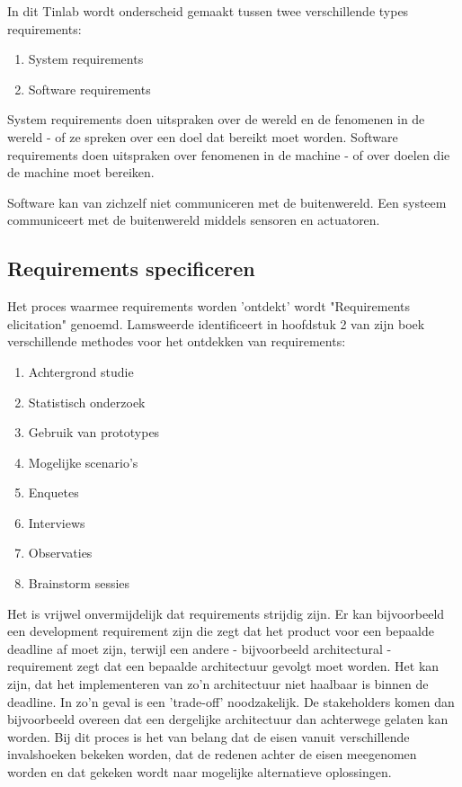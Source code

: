 \documentclass{article}
\begin{document}
	In dit Tinlab wordt onderscheid gemaakt tussen twee verschillende types requirements:

	\begin{enumerate}
		\item System requirements
		\item Software requirements
	\end{enumerate}

	System requirements doen uitspraken over de wereld en de fenomenen in de wereld - of ze spreken over een doel dat bereikt moet worden. Software requirements doen uitspraken over fenomenen in de machine - of over doelen die de machine moet bereiken. \par

	Software kan van zichzelf niet communiceren met de buitenwereld. Een systeem communiceert met de buitenwereld middels sensoren en actuatoren. \par
		
		\subsection{Requirements specificeren}
		
		Het proces waarmee requirements worden 'ontdekt' wordt "Requirements elicitation" genoemd. Lamsweerde identificeert in hoofdstuk 2 van zijn boek verschillende methodes voor het ontdekken van requirements:

		\begin{enumerate}
			\item Achtergrond studie
			\item Statistisch onderzoek
			\item Gebruik van prototypes
			\item Mogelijke scenario's 
			\item Enquetes
			\item Interviews
			\item Observaties
			\item Brainstorm sessies
		\end{enumerate}

		Het is vrijwel onvermijdelijk dat requirements strijdig zijn. Er kan bijvoorbeeld een development requirement zijn die zegt dat het product voor een bepaalde deadline af moet zijn, terwijl een andere - bijvoorbeeld architectural - requirement zegt dat een bepaalde architectuur gevolgt moet worden. Het kan zijn, dat het implementeren van zo'n architectuur niet haalbaar is binnen de deadline. In zo'n geval is een 'trade-off' noodzakelijk. De stakeholders komen dan bijvoorbeeld overeen dat een dergelijke architectuur dan achterwege gelaten kan worden. Bij dit proces is het van belang dat de eisen vanuit verschillende invalshoeken bekeken worden, dat de redenen achter de eisen meegenomen worden en dat gekeken wordt naar mogelijke alternatieve oplossingen. \par
		
\end{document}
